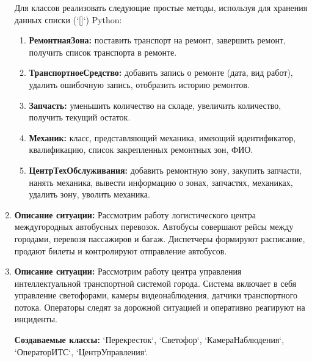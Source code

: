 \begin{enumerate}
Для классов реализовать следующие простые методы, используя для хранения данных списки (`[]`) Python:
\begin{enumerate}
    \item \textbf{РемонтнаяЗона:} поставить транспорт на ремонт, 
    завершить ремонт, получить список транспорта в ремонте.
    \item \textbf{ТранспортноеСредство:} добавить запись о ремонте (дата, вид работ), 
    удалить ошибочную запись, отобразить историю ремонтов.
    \item \textbf{Запчасть:} уменьшить количество на складе, увеличить количество, 
    получить текущий остаток.
    \item \textbf{Механик:} класс, представляющий механика, имеющий идентификатор, 
    квалификацию, список закрепленных ремонтных зон, ФИО.
    \item \textbf{ЦентрТехОбслуживания:} добавить ремонтную зону, закупить запчасти, 
    нанять механика, вывести информацию о зонах, запчастях, механиках, удалить зону, уволить механика.
\end{enumerate}

\item \textbf{Описание ситуации:} Рассмотрим работу логистического центра 
междугородных автобусных перевозок. Автобусы совершают рейсы между городами, 
перевозя пассажиров и багаж. Диспетчеры формируют расписание, 
продают билеты и контролируют отправление автобусов.

\item \textbf{Описание ситуации:} Рассмотрим работу центра управления интеллектуальной 
транспортной системой города. Система включает в себя управление светофорами, 
камеры видеонаблюдения, датчики транспортного потока. Операторы следят 
за дорожной ситуацией и оперативно реагируют на инциденты.

\textbf{Создаваемые классы:} `Перекресток`, `Светофор`, `КамераНаблюдения`, `ОператорИТС`, `ЦентрУправления`.


\end{enumerate}
